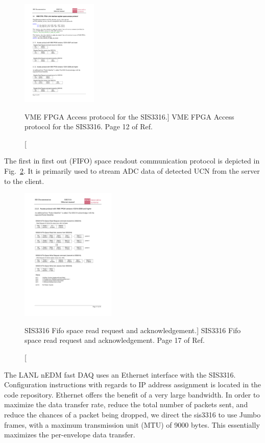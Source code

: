 \begin{figure}
    \centering
    \includegraphics[height=2in]{figures/sis3316_ethernet_ack.pdf}
    \caption
    [VME FPGA Access protocol for the SIS3316.]
     {VME FPGA Access protocol for the SIS3316. Page 12 of Ref.~\cite{sis3316_udp_addendum}}
    \label{fig:sis3316_read_write_ack}
\end{figure}

The first in first out (FIFO) space readout communication protocol is depicted in Fig.~\ref{fig:sis3316_fifo}. It is primarily used to stream ADC data of detected UCN from the server to the client.

\begin{figure}
    \centering
    \includegraphics[height=2.5in]{figures/sis3316_fifo.pdf}
    \caption
    [SIS3316 Fifo space read request and acknowledgement.]
     {SIS3316 Fifo space read request and acknowledgement. Page 17 of Ref.~\cite{sis3316_udp_addendum}}
    \label{fig:sis3316_fifo}
\end{figure}


The LANL nEDM fast DAQ uses an Ethernet interface with the SIS3316. Configuration instructions with regards to IP address assignment is located in the code repository. Ethernet offers the benefit of a very large bandwidth. In order to maximize the data transfer rate, reduce the total number of packets sent, and reduce the chances of a packet being dropped, we direct the sis3316 to use Jumbo frames, with a maximum transmission unit (MTU) of 9000 bytes. This essentially maximizes the per-envelope data transfer.


